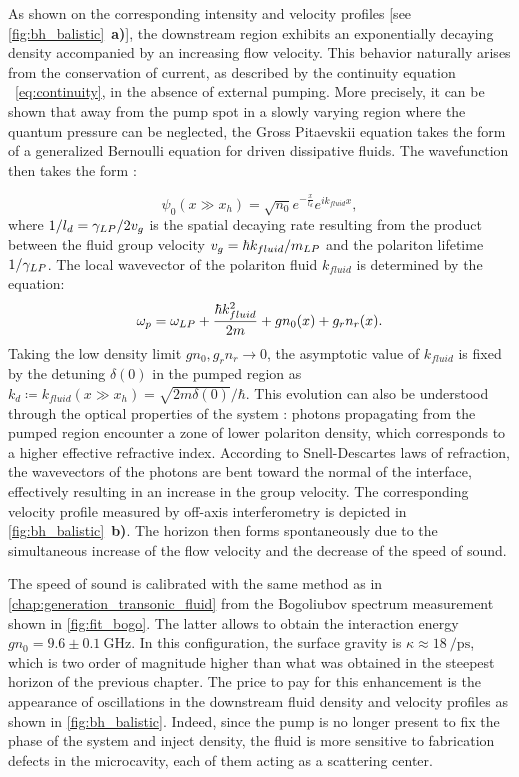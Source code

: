 As shown on the corresponding intensity and velocity profiles [see \autoref{fig:bh_balistic}~\textbf{a)}], the downstream region exhibits an exponentially decaying density accompanied by an increasing flow velocity. 
This behavior naturally arises from the conservation of current, as described by the continuity equation ~\ref{eq:continuity}, in the absence of external pumping. More precisely, it can be shown that 
away from the pump spot in a slowly varying region where the quantum pressure can be neglected, the Gross Pitaevskii equation takes the form of a generalized Bernoulli equation for driven dissipative fluids. The wavefunction then takes the form \cite{carusotto_inhomogeneous_2008}: 

\begin{equation}
    \psi_0(x \gg x_h) = \sqrt{n_0}e^{-\frac{x}{l_d}}e^{i k_{fluid}x},
\end{equation}
where $1/l_d=\gamma_{LP}/2v_g$ is the spatial decaying rate resulting from the product between the fluid group velocity $v_g =\hbar k_{fluid}/m_{LP} $ and the polariton lifetime $1/\gamma_{LP}$. The local wavevector of the polariton fluid $k_{fluid}$ is determined by the equation: 
\begin{equation} 
    \omega_p = \omega_{LP} + \frac{\hbar k_{fluid}^2}{2m} + gn_0(x) + g_r n_r(x).
    \label{eq:bernoulli}
\end{equation}
Taking the low density limit $gn_0, g_rn_r \to 0$, the asymptotic value of $k_{fluid}$ is fixed by the detuning $\delta(0)$ in the pumped region as $k_d \coloneqq k_{fluid}(x \gg x_h) = \sqrt{2m\delta(0)}/\hbar$.
This evolution can also be understood through the optical properties of the system : photons propagating from the pumped region encounter a zone of lower polariton density, which corresponds to a higher effective refractive index. According to Snell-Descartes laws of refraction, the wavevectors of the photons are bent toward the normal of the interface, effectively resulting in an increase in the group velocity. 
The corresponding velocity profile measured by off-axis interferometry is depicted in \autoref{fig:bh_balistic}~\textbf{b)}.  The horizon then forms
spontaneously due to the simultaneous increase of the flow velocity and the decrease of the speed of sound.

\bigskip


The speed of sound is calibrated with the same method as in \autoref{chap:generation_transonic_fluid} from the Bogoliubov spectrum measurement shown in \autoref{fig:fit_bogo}. The latter allows to obtain the interaction energy $gn_0 =9.6 \pm \SI{0.1}{\giga \hertz}$.
In this configuration, the surface gravity is $\kappa\approx \SI{18}{\per \pico \second}$, which is two order of magnitude higher than what was obtained 
in the steepest horizon of the previous chapter. The price to pay for this enhancement is the appearance of oscillations in the downstream fluid density and velocity profiles as shown in \autoref{fig:bh_balistic}.
Indeed, since the pump is no longer present to fix the phase of the system and inject density, the fluid is more sensitive to fabrication defects in the microcavity, each of them
acting as a scattering center.



